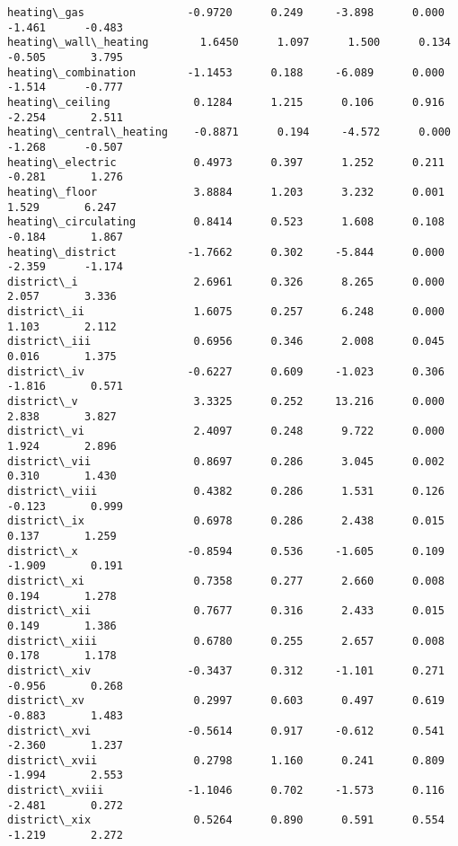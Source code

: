 \documentclass[11pt]{article}
\begin{document}
\begin{Verbatim}[commandchars=\\\{\}]
heating\_gas                -0.9720      0.249     -3.898      0.000      -1.461      -0.483
heating\_wall\_heating        1.6450      1.097      1.500      0.134      -0.505       3.795
heating\_combination        -1.1453      0.188     -6.089      0.000      -1.514      -0.777
heating\_ceiling             0.1284      1.215      0.106      0.916      -2.254       2.511
heating\_central\_heating    -0.8871      0.194     -4.572      0.000      -1.268      -0.507
heating\_electric            0.4973      0.397      1.252      0.211      -0.281       1.276
heating\_floor               3.8884      1.203      3.232      0.001       1.529       6.247
heating\_circulating         0.8414      0.523      1.608      0.108      -0.184       1.867
heating\_district           -1.7662      0.302     -5.844      0.000      -2.359      -1.174
district\_i                  2.6961      0.326      8.265      0.000       2.057       3.336
district\_ii                 1.6075      0.257      6.248      0.000       1.103       2.112
district\_iii                0.6956      0.346      2.008      0.045       0.016       1.375
district\_iv                -0.6227      0.609     -1.023      0.306      -1.816       0.571
district\_v                  3.3325      0.252     13.216      0.000       2.838       3.827
district\_vi                 2.4097      0.248      9.722      0.000       1.924       2.896
district\_vii                0.8697      0.286      3.045      0.002       0.310       1.430
district\_viii               0.4382      0.286      1.531      0.126      -0.123       0.999
district\_ix                 0.6978      0.286      2.438      0.015       0.137       1.259
district\_x                 -0.8594      0.536     -1.605      0.109      -1.909       0.191
district\_xi                 0.7358      0.277      2.660      0.008       0.194       1.278
district\_xii                0.7677      0.316      2.433      0.015       0.149       1.386
district\_xiii               0.6780      0.255      2.657      0.008       0.178       1.178
district\_xiv               -0.3437      0.312     -1.101      0.271      -0.956       0.268
district\_xv                 0.2997      0.603      0.497      0.619      -0.883       1.483
district\_xvi               -0.5614      0.917     -0.612      0.541      -2.360       1.237
district\_xvii               0.2798      1.160      0.241      0.809      -1.994       2.553
district\_xviii             -1.1046      0.702     -1.573      0.116      -2.481       0.272
district\_xix                0.5264      0.890      0.591      0.554      -1.219       2.272

\end{Verbatim}
\end{document}
